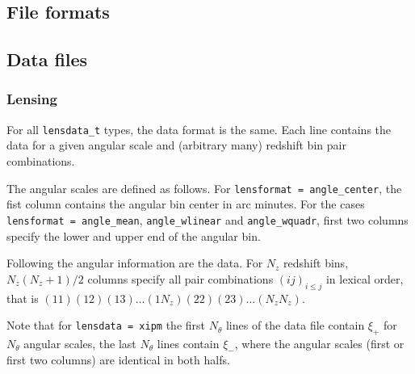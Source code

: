 \documentclass[11pt, chapterprefix, headsepline]{scrartcl}
\begin{document}




\begin{appendix}

\section{File formats}

\subsection{Data files}

\subsubsection{Lensing}
\label{sec:data_lens}

For all \texttt{lensdata\_t} types, the data format is the same. Each
line contains the data for a given angular scale and (arbitrary many)
redshift bin pair combinations.

The angular scales are defined as
follows. For \texttt{lensformat = angle\_center}, the fist column
contains the angular bin center in arc minutes. For the cases \texttt{lensformat
  = angle\_mean}, \texttt{angle\_wlinear} and \texttt{angle\_wquadr},  first
two columns specify the lower and upper end of the angular bin.

Following the angular information are the data. For $N_z$ redshift bins,
$N_z(N_z+1)/2$ columns specify all pair combinations $(ij)_{i\le j}$ in
lexical order, that is $(11)(12)(13) \ldots (1N_z)(22)(23) \ldots (N_z
N_z)$.

Note that for \texttt{lensdata = xipm} the first $N_\theta$ lines of
the data file contain $\xi_+$ for $N_\theta$ angular scales, the last
$N_\theta$ lines contain $\xi_-$, where the angular scales (first or
first two columns) are identical in both halfs. 



\end{appendix}
\end{document}

